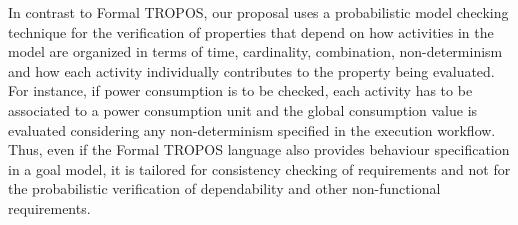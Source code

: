 
In contrast to Formal TROPOS, our proposal uses a probabilistic model checking technique for the verification of properties that depend on how activities in the model are organized in terms of time, cardinality, combination, non-determinism and how each activity individually contributes to the property being evaluated. For instance, if power consumption is to be checked, each activity has to be associated to a power consumption unit and the global consumption value is evaluated considering any non-determinism specified in the execution workflow. Thus, even if the Formal TROPOS language also provides behaviour specification in a goal model, it is tailored for consistency checking of requirements and not for the probabilistic verification of dependability and other non-functional requirements.

%

